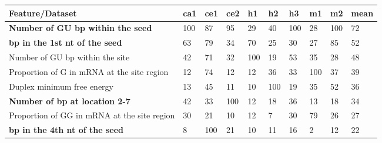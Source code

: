 \documentclass{bmcart}
\begin{document}
\begin{backmatter}
\begin{table}[h!]
\begin{threeparttable}
{\begin{tabular}{|l|l|l|l|l|l|l|l|l|l|}
\hline
\textbf{Feature/Dataset}                          & \textbf{ca1} & \textbf{ce1} & \textbf{ce2} & \textbf{h1} & \textbf{h2} & \textbf{h3} & \textbf{m1} & \textbf{m2} & \textbf{mean} \\ \hline
\textbf{Number of GU bp within the seed\tnote{n}}              & 100\tnote{*}          & 87\tnote{*}           & 95\tnote{*}           & 29\tnote{*}          & 40\tnote{*}          & 100\tnote{*}         & 28          & 100\tnote{*}         & 72            \\ \hline
\textbf{bp in the 1st nt of the seed\tnote{b}}                    & 63\tnote{*}           & 79\tnote{*}           & 34\tnote{*}           & 70\tnote{*}          & 25\tnote{*}          & 30\tnote{*}          & 27          & 85\tnote{*}          & 52            \\ \hline
Number of GU bp within the site\tnote{n}                      & 42\tnote{*}           & 71\tnote{*}           & 32\tnote{*}           & 100\tnote{*}         & 19          & 53\tnote{*}          & 35\tnote{*}          & 28\tnote{*}          & 48            \\ \hline
Proportion of G in mRNA at the site region\tnote{n}                             & 12           & 74\tnote{*}           & 12           & 12          & 36\tnote{*}          & 33\tnote{*}          & 100\tnote{*}         & 37\tnote{*}          & 39            \\ \hline
Duplex minimum free energy\tnote{n}                               & 13\tnote{*}           & 45           & 11           & 10          & 100\tnote{*}         & 19          & 35\tnote{*}          & 52\tnote{*}          & 36            \\ \hline
\textbf{Number of bp at location 2-7\tnote{n}} & 42\tnote{*}           & 33           & 100\tnote{*}          & 12          & 18          & 36\tnote{*}          & 13          & 18          & 34            \\ \hline
Proportion of GG in mRNA at the site region\tnote{n}                            & 30\tnote{*}           & 21           & 10           & 12          & 7           & 30\tnote{*}          & 79\tnote{*}          & 26\tnote{*}          & 27            \\ \hline
\textbf{bp in the 4th nt of the seed\tnote{b}}                    & 8            & 100\tnote{*}          & 21           & 10          & 11          & 16          & 2           & 12          & 22            \\ \hline

\end{tabular}}
\end{threeparttable}
\end{table}
\end{backmatter}
\end{document}
